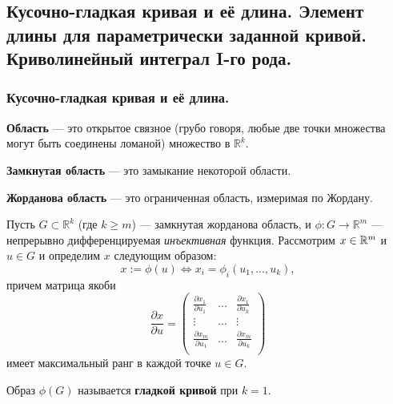 \subsection{Кусочно-гладкая кривая и её длина. Элемент длины для параметрически заданной кривой. Криволинейный интеграл I-го рода.}

\subsubsection{Кусочно-гладкая кривая и её длина.}

\begin{definition*}
    \textbf{Область} --- это открытое связное (грубо говоря, любые две точки множества могут быть соединены ломаной) множество в $\mathbb{R}^k$.
\end{definition*}

\begin{definition*}
    \textbf{Замкнутая область} --- это замыкание некоторой области.
\end{definition*}

\begin{definition*}
    \textbf{Жорданова область} --- это ограниченная область, измеримая по Жордану.
\end{definition*}

Пусть $G \subset \mathbb{R}^k$ (где $k \geq m$) --- замкнутая жорданова область, и $\phi: G \rightarrow \mathbb{R}^m$ --- непрерывно дифференцируемая \textit{инъективная} функция. Рассмотрим $x \in \mathbb{R}^m$ и  $u \in G$ и определим $x$ следующим образом:
\begin{equation*}
    x := \phi(u) \iff x_i = \phi_i(u_1, ..., u_k),
\end{equation*}
причем матрица якоби
\begin{equation*}
    \dfrac{\partial x}{\partial u} 
    = 
    \begin{pmatrix}
        \frac{\partial x_1}{\partial u_1} & ... & \frac{\partial x_1}{\partial u_k} \\
        \vdots & ... & \vdots \\
        \frac{\partial x_m}{\partial u_1} & ... & \frac{\partial x_m}{\partial u_k} \\
    \end{pmatrix}
\end{equation*}
имеет максимальный ранг в каждой точке $u \in G$.

\begin{definition*}
    Образ $\phi(G)$ называется \textbf{гладкой кривой} при $k = 1$.
\end{definition*}

